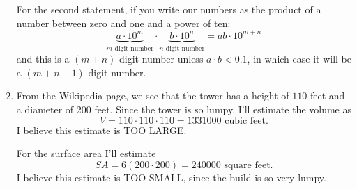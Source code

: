 \documentclass[nooutcomes,noauthor,handout,hints]{ximera}
\begin{document}
\begin{question}
\begin{freeResponse}
\begin{enumerate}
      For the second statement, if you write our numbers as the
      product of a number between zero and one and a power of ten:
      \[
      \underbrace{a\cdot 10^m}_{\text{$m$-digit number}} \cdot \underbrace{b\cdot 10^n}_{\text{$n$-digit number}} = ab\cdot 10^{m+n}
      \]
      and this is a $(m+n)$-digit number unless $a\cdot b<0.1$, in which
      case it will be a $(m+n-1)$-digit number.
    \item From the Wikipedia page, we see that the tower has a height
      of $110$ feet and a diameter of $200$ feet. Since the tower is so lumpy, I'll estimate the volume as
      \[
      V = 110\cdot 110\cdot 110 = 1331000 \text{ cubic feet}.
      \]
      I believe this estimate is TOO LARGE.

      For the surface area I'll estimate
      \[
      SA = 6(200\cdot 200) = 240000\text{ square feet}.
      \]
      I believe this estimate is TOO SMALL, since the build is so very
      lumpy.
    \end{enumerate}
  \end{freeResponse}
\end{question}
\end{document}
